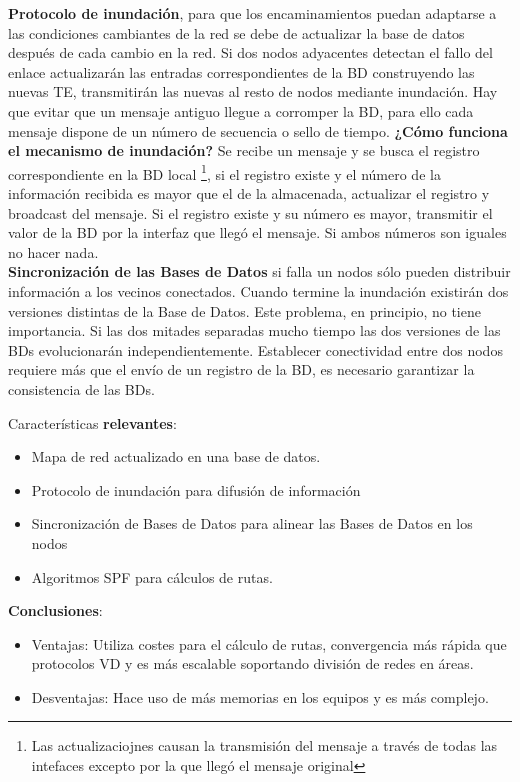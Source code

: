 \documentclass[10pt,portrait, twocolumn]{article}
\begin{document}
\textbf{Protocolo de inundación}, para que los encaminamientos puedan adaptarse a las condiciones cambiantes de la red se debe de actualizar la base de datos después de cada cambio en la red. Si dos nodos adyacentes detectan el fallo del enlace actualizarán las entradas correspondientes de la BD construyendo las nuevas TE, transmitirán las nuevas al resto de nodos mediante inundación. Hay que evitar que un mensaje antiguo llegue a corromper la BD, para ello cada mensaje dispone de un número de secuencia o sello de tiempo. \textbf{¿Cómo funciona el mecanismo de inundación?} Se recibe un mensaje y se busca el registro correspondiente en la BD local \footnote{Las actualizaciojnes causan la transmisión del mensaje a través de todas las intefaces excepto por la que llegó el mensaje original}, si el registro existe y el número de la información recibida es mayor que el de la almacenada, actualizar el registro y broadcast del mensaje. Si el registro existe y su número es mayor, transmitir el valor de la BD por la interfaz que llegó el mensaje. Si ambos números son iguales no hacer nada.\\

\textbf{Sincronización de las Bases de Datos} si falla un nodos sólo pueden distribuir información a los vecinos conectados. Cuando termine la inundación existirán dos versiones distintas de la Base de Datos. Este problema, en principio, no tiene importancia. Si las dos mitades separadas mucho tiempo las dos versiones de las BDs evolucionarán independientemente. Establecer conectividad entre dos nodos requiere más que el envío de un registro de la BD, es necesario garantizar la consistencia de las BDs.

Características \textbf{relevantes}:

	\begin{itemize}
		\item Mapa de red actualizado en una base de datos.
		\item Protocolo de inundación para difusión de información
		\item Sincronización de Bases de Datos para alinear las Bases de Datos en los nodos
		\item Algoritmos SPF para cálculos de rutas.
	\end{itemize}
	
\textbf{Conclusiones}:

	\begin{itemize}
		\item Ventajas: Utiliza costes para el cálculo de rutas, convergencia más rápida que protocolos VD y es más escalable soportando división de redes en áreas.
		\item Desventajas: Hace uso de más memorias en los equipos y es más complejo.
	\end{itemize}
\end{document}
